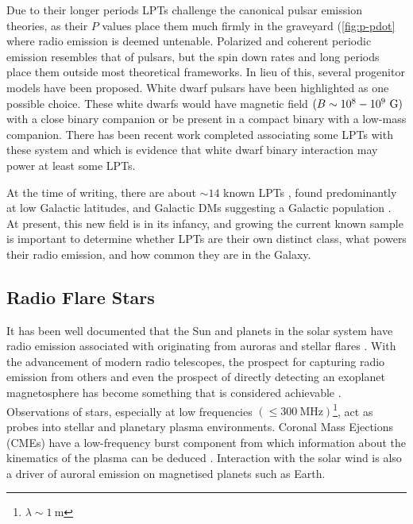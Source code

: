 Due to their longer periods LPTs challenge the canonical pulsar emission theories, as their $P$ values place them much firmly in the graveyard (\cref{fig:p-pdot} where radio emission is deemed untenable. Polarized and coherent periodic emission resembles that of pulsars, but the spin down rates and long periods place them outside most theoretical frameworks.  In lieu of this, several progenitor models have been proposed. White dwarf pulsars have been highlighted as one possible choice. These white dwarfs would have magnetic field $(B\sim10^{8}-10^{9} ~ \rm G)$ with a close binary companion or be present in a compact binary with a low-mass companion. There has been recent work completed associating some LPTs with these system \cite{anumarlapudi_sample_2026} and \cite{pelisoli_constraints_2025} which is evidence that white dwarf binary interaction may power at least some LPTs. 

At the time of writing, there are about $\sim 14$ known LPTs \citep[i.e.][]{rea_long_2026}, found predominantly at low Galactic latitudes, and Galactic DMs suggesting a Galactic population \citep{caleb_long-period_2026}. At present, this new field is in its infancy, and growing the current known sample is important to determine whether LPTs are their own distinct class, what powers their radio emission, and how common they are in the Galaxy. 




\subsection{Radio Flare Stars} \label{sec:RadioFlareStars}

 It has been well documented that the Sun and planets in the solar system have radio emission associated with originating from auroras and stellar flares \citep{murphy_lofar_2021, zarka_auroral_1998}. With the advancement of modern radio telescopes, the prospect for capturing radio emission from others and even the prospect of directly detecting an exoplanet magnetosphere has become something that is considered achievable \citep{vedantham_coherent_2020}. Observations of stars, especially at low frequencies $(\leq 300 \ \text{MHz})$\footnote{$\lambda \sim 1 \ \text{m}$}, act as probes into stellar and planetary plasma environments. Coronal Mass Ejections (CMEs) have a low-frequency burst component from which information about the kinematics of the plasma can be deduced \citep{villadsen_ultra-wideband_2019}. Interaction with the solar wind is also a driver of auroral emission on magnetised planets such as Earth. \

